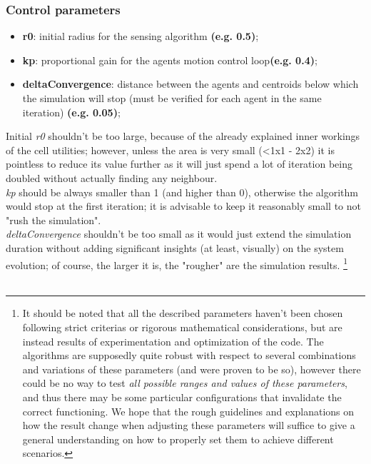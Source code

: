 \documentclass[a4paper,11pt,oneside]{book}
\begin{document}
	
	
	\subsubsection{Control parameters}
	\begin{itemize}
		\item \textbf{r0}: initial radius for the sensing algorithm \textbf{(e.g. 0.5)};
		\item \textbf{kp}: proportional gain for the agents motion control loop\textbf{(e.g. 0.4)};
		\item \textbf{deltaConvergence}: distance between the agents and centroids below which the simulation will stop (must be verified for each agent in the same iteration) \textbf{(e.g. 0.05)};
	\end{itemize}
	
	Initial \textit{r0} shouldn't be too large, because of the already explained inner workings of the cell utilities; however, unless the area is very small (<1x1 - 2x2) it is pointless to reduce its value further as it will just spend a lot of iteration being doubled without actually finding any neighbour.\\
	
	\textit{kp} should be always smaller than 1 (and higher than 0), otherwise the algorithm would stop at the first iteration; it is advisable to keep it reasonably small to not "rush the simulation".\\
	
	\textit{deltaConvergence} shouldn't be too small as it would just extend the simulation duration without adding significant insights (at least, visually) on the system evolution; of course, the larger it is, the "rougher" are the simulation results.
	\footnote{It should be noted that all the described parameters haven't been chosen following strict criterias or rigorous mathematical considerations, but are instead results of experimentation and optimization of the code. The algorithms are supposedly quite robust with respect to several combinations and variations of these parameters (and were proven to be so), however there could be no way to test \emph{all possible ranges and values of these parameters}, and thus there may be some particular configurations that invalidate the correct functioning. We hope that the rough guidelines and explanations on how the result change when adjusting these parameters will suffice to give a general understanding on how to properly set them to achieve different scenarios.}\\\\
	
\end{document}
